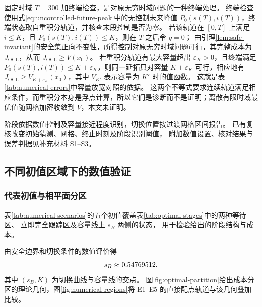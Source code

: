 \documentclass[11pt,a4paper,UTF8]{ctexart}
\theoremstyle{definition}
\begin{document}
固定时域 $T=300$ 加终端检查，是对原无穷时域问题的一种终端处理。
终端检查使用式\eqref{eq:uncontrolled-future-peak}中的无控制未来峰值 $P_0(s(T),i(T))$，终端状态取自重积分轨道，并核查末段控制是否为零。
若该轨道在 $[0,T]$ 上满足 $i\le K$，且 $P_0(s(T),i(T))\le K$，则在 $T$ 之后令 $q=0$；
由引理\ref{lem:safe-invariant}的安全集正向不变性，所得控制对原无穷时域问题可行，其完整成本为 $J_{\mathrm{OCL}}$，从而 $J_{\mathrm{OCL}}\ge V(x_0)$。
若重积分轨道有最大容量超出 $\varepsilon_K>0$，且终端满足 $P_0(s(T),i(T))\le K+\varepsilon_K$，则同一延拓只对容量 $K+\varepsilon_K$ 可行，相应地有 $J_{\mathrm{OCL}}\ge V_{K+\varepsilon_K}(x_0)$，其中 $V_{K'}$ 表示容量为 $K'$ 时的值函数。
这就是表\ref{tab:numerical-errors}中容量放宽对照的依据。
这两个不等式要求连续轨道满足相应条件，而重积分本身是浮点计算，所以它们是诊断而不是证明；离散有限时域最优值随网格加密收敛到 $V$，本文未证明。

阶段依据数值控制及容量接近程度识别，切换位置按过渡网格区间报告。
已有复核改变初始猜测、网格、终止时刻及阶段识别阈值，
附加数值设置、核对结果与误差判据见补充材料 S1--S3。

\subsection{不同初值区域下的数值验证}
\label{sec:numerical-results}

\subsubsection{代表初值与相平面分区}

表\ref{tab:numerical-scenarios}的五个初值覆盖表\ref{tab:optimal-stages}中的两种等待区、
立即完全跟踪区及容量线上 $s_B$ 两侧的状态，
用于检验给出的阶段结构与成本。

由安全边界和切换条件的数值评价得
\begin{equation}
 s_B\approx0.54769512,
 \label{eq:numerical-sB}
\end{equation}
其中 $(s_B,K)$ 为切换曲线与容量线的交点。
图\ref{fig:optimal-partition}给出成本分区的理论几何，图\ref{fig:numerical-regions}将 E1--E5 的直接配点轨道与该几何叠加比较。
\end{document}

